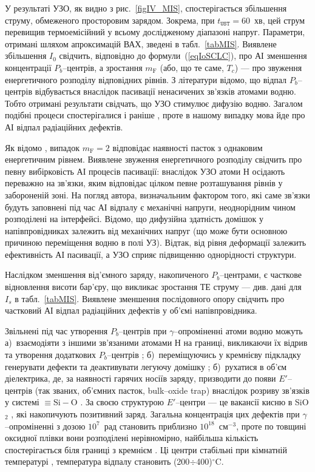 У результаті УЗО, як видно з рис.~\ref{figIV_MIS}, спостерігається збільшення струму, обмеженого просторовим зарядом.
Зокрема, при $t_\mathtt{UST}=60$~хв, цей струм перевищив термоемісійний у всьому дослідженому діапазоні напруг.
Параметри, отримані шляхом апроксимацій ВАХ, зведені в табл.~\ref{tabMIS}.
Виявлене збільшення $I_0$ свідчить, відповідно до формули~(\ref{eqIoSCLC}), про АІ зменшення концентрації $P_b$--центрів, а зростання $m_\mathrm{F}$ (або, що те саме, $T_c$) --- про звуження енергетичного розподілу відповідних рівнів.
З літератури \cite{SiO2:Takakura,SiO2:Wurzer} відомо, що відпал $P_b$--центрів відбувається внаслідок пасивації ненасичених зв'язків атомами водню.
Тобто отримані результати свідчать, що УЗО стимулює дифузію водню.
Загалом подібні процеси спостерігалися і раніше \cite{Ostap:SiO2,Ostap:PhotoLum,ostapenko1997}, проте в нашому випадку мова йде про АІ відпал радіаційних дефектів.


Як відомо \cite{Jafar}, випадок $m_\mathrm{F}=2$ відповідає наявності пасток з однаковим енергетичним рівнем.
Виявлене звуження енергетичного розподілу свідчить про певну вибірковість АІ процесів пасивації:
внаслідок УЗО атоми Н осідають переважно на зв'язки, яким відповідає цілком певне розташування рівнів у забороненій зоні.
На погляд автора, визначальним фактором того, які саме зв'язки будуть заповнені під час АІ відпалу є механічні напруги, неоднорідним чином розподілені на інтерфейсі.
Відомо, що дифузійна здатність домішок у напівпровідниках залежить від механічних напруг \cite{AZIZ2001}
(що може бути основною причиною переміщення водню в полі УЗ).
Відтак, від рівня деформації залежить ефективність АІ пасивації, а УЗО сприяє підвищенню однорідності структури.

Наслідком зменшення від'ємного заряду, накопиченого $P_b$--центрами, є часткове відновлення висоти бар'єру, що викликає зростання ТЕ струму --- див. дані для $I_s$ в табл.~\ref{tabMIS}.
Виявлене зменшення послідовного опору свідчить про частковий АІ відпал радіаційних дефектів у об'ємі напівпровідника.

Звільнені під час утворення $P_b$--центрів при $\gamma$--опроміненні атоми водню можуть
а)~взаємодіяти з іншими зв'язаними атомами Н на границі, викликаючи їх відрив та утворення додаткових $P_b$--центрів \cite{SiO2:Devine};
б)~переміщуючись у кремнієву підкладку генерувати дефекти та деактивувати легуючу домішку \cite{SiO2:DiMaria};
б)~рухатися в об'єм діелектрика, де, за наявності гарячих носіїв заряду, призводити до появи $E'$--центрів (так званих, об'ємних пасток, bulk--oxide trap) внаслідок розриву зв'язків у системі $\equiv\!\text{Si}\!-\!\text{O}$ \cite{SiO2:Mahapatra,SiO2:Esseni}.
За своєю структурою $E'$--центри --- це вакансії кисню в SiO$_2$ \cite{SiO2:Takakura,SiO2:Devine},
які накопичують позитивний заряд.
Загальна концентрація цих дефектів при $\gamma$--опроміненні з дозою $10^{7}$~рад становить приблизно $10^{18}$~см$^{-3}$, проте по товщині оксидної плівки вони розподілені нерівномірно, найбільша кількість спостерігається біля границі з кремнієм \cite{PersenkovBook}.
Ці центри стабільні при кімнатній температурі \cite{SiO2:Mahapatra}, температура відпалу становить (200$\div$400)$^\circ$C.

